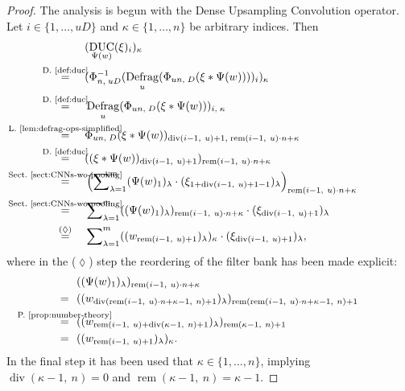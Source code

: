 \documentclass[journal]{IEEEtran}
\newcommand{\conv}{\ast}
\newcommand{\discint}[2]{\{#1,\dotsc,#2\}}
\newcommand{\inint}[2]{\in\discint{#1}{#2}}
\DeclareMathOperator{\Defragmentation}{Defrag}
\renewcommand{\div}[2]{\operatorname{div}(#1,\ #2)}
\newcommand{\rem}[2]{\operatorname{rem}(#1,\ #2)}
\newcommand{\equsing}[1]{\overset{\mathclap{\text{#1}}}{=}}
\DeclareMathOperator{\DUC}{DUC}
\begin{document}
\begin{proof}
The analysis is begun with the Dense Upsampling Convolution operator.
Let $i\inint{1}{uD}$ and $\kappa\inint{1}{n}$ be arbitrary indices.
Then
\begin{align*}
  & (\DUC_{\Psi(w)}(\xi)_i)_\kappa\\
  \equsing{D.~\ref{def:duc}}\ \ \ \ & (\Phi_{n,\; uD}^{-1}( \Defragmentation_u( \Phi_{un,\; D}( \xi \conv \Psi(w) ) ) )_i)_\kappa\\
  \equsing{D.~\ref{def:duc}}\ \ \ \ & \Defragmentation_u( \Phi_{un,\; D}( \xi \conv \Psi(w) ) )_{i,\; \kappa}\\
  \equsing{L.~\ref{lem:defrag-ops-simplified}}\ \ \ \ & \Phi_{un,\; D}( \xi \conv \Psi(w) )_{\div{i - 1}{u} + 1,\; \rem{i - 1}{u}\cdot n + \kappa}\\
  \equsing{D.~\ref{def:duc}}\ \ \ \ & ( ( \xi \conv \Psi(w) )_{\div{i - 1}{u} + 1} )_{\rem{i - 1}{u}\cdot n + \kappa}\\
  \equsing{Sect.~\ref{sect:CNNs-wo-pooling}}\ \ \ \ & \left(\sum\nolimits_{\lambda = 1}^m (\Psi(w)_1)_\lambda \cdot (\xi_{1 + \div{i - 1}{u} + 1 - 1})_\lambda \right)_{\rem{i - 1}{u}\cdot n + \kappa}\\
  \equsing{Sect.~\ref{sect:CNNs-wo-pooling}}\ \ \ \ & \sum\nolimits_{\lambda = 1}^m ((\Psi(w)_1)_\lambda)_{\rem{i - 1}{u}\cdot n + \kappa} \cdot (\xi_{\div{i - 1}{u} + 1})_\lambda\\
  \equsing{($\lozenge$)}\ \ \ \ & \sum\nolimits_{\lambda = 1}^m ((w_{\rem{i - 1}{u} + 1})_\lambda)_\kappa \cdot (\xi_{\div{i - 1}{u} + 1})_\lambda\text{,}
\end{align*}
where in the ($\lozenge$) step the reordering of the filter bank has been made explicit:
\begin{align*}
  & ((\Psi(w)_1)_\lambda)_{\rem{i - 1}{u}\cdot n + \kappa}\\
  =\ \ & ((w_{\div{ \rem{i - 1}{u}\cdot n + \kappa - 1 }{n} + 1})_\lambda)_{\rem{ \rem{i - 1}{u}\cdot n + \kappa - 1 }{n} + 1}\\
  \equsing{P.~\ref{prop:number-theory}}\ \ & ((w_{\rem{i - 1}{u} + \div{\kappa - 1}{n} + 1})_\lambda)_{\rem{\kappa - 1}{n} + 1}\\
  =\ \ & ((w_{\rem{i - 1}{u} + 1})_\lambda)_\kappa\text{.}
\end{align*}
In the final step it has been used that $\kappa\inint{1}{n}$, implying $\div{\kappa - 1}{n} = 0$ and $\rem{\kappa - 1}{n} = \kappa - 1$.


\end{proof}
\end{document}
